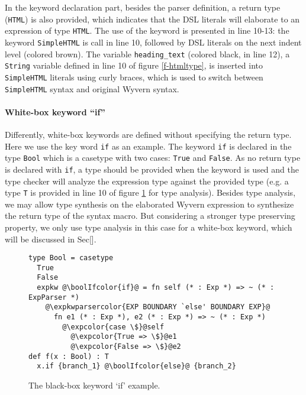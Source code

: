 \documentclass{sig-alternate}
\newcommand{\expkwparsercolor}[1]{\textcolor[HTML]{336699}{#1}}
\newcommand{\expcolor}[1]{\textcolor[HTML]{FF0033}{#1}}
\newcommand{\boolIfcolor}[1]{\textcolor[HTML]{5E0C0C}{#1}}
\newcommand{\mycaption}[1]{\vspace{-4px}\caption{#1}\vspace{-2px}}
\begin{document}
In the keyword declaration part, besides the parser definition, a return type (\verb|HTML|) is also provided, which indicates that the DSL literals will elaborate to an expression of type \verb|HTML|. The use of the keyword is presented in line 10-13: the keyword \verb|SimpleHTML| is call in line 10, followed by DSL literals on the next indent level (colored brown). The variable \verb|heading_text| (colored black, in line 12), a \verb|String| variable defined in line 10 of figure \ref{f-htmltype}, is inserted into \verb|SimpleHTML| literals using curly braces, which is used to switch between \verb|SimpleHTML| syntax and original Wyvern syntax.


\paragraph{White-box keyword ``if''}
Differently, white-box keywords are defined without specifying the return type. Here we use the key word \verb|if| as an example. The keyword \verb|if| is declared in the type \verb|Bool| which is a casetype with two cases: \verb|True| and \verb|False|. As no return type is declared with \verb|if|, a type should be provided when the keyword is used and the type checker will analyze the expression type against the provided type (e.g. a type \verb|T| is provided in line 10 of figure \ref{if-example} for type analysis). Besides type analysis, we may allow type synthesis on the elaborated Wyvern expression to synthesize the return type of the syntax macro. But considering a stronger type preserving property, we only use type analysis in this case for a white-box keyword, which will be discussed in Sec[].

\begin{figure}[ht]
\begin{lstlisting}[style=wyvern]
type Bool = casetype 
  True
  False
  expkw @\boolIfcolor{if}@ = fn self (* : Exp *) => ~ (* : ExpParser *)
    @\expkwparsercolor{EXP BOUNDARY `else' BOUNDARY EXP}@
      fn e1 (* : Exp *), e2 (* : Exp *) => ~ (* : Exp *)
        @\expcolor{case \$}@self
          @\expcolor{True => \$}@e1
          @\expcolor{False => \$}@e2
def f(x : Bool) : T
  x.if {branch_1} @\boolIfcolor{else}@ {branch_2}
\end{lstlisting}
\mycaption{The black-box keyword `if' example.}
\label{if-example}
\end{figure}
\end{document}
